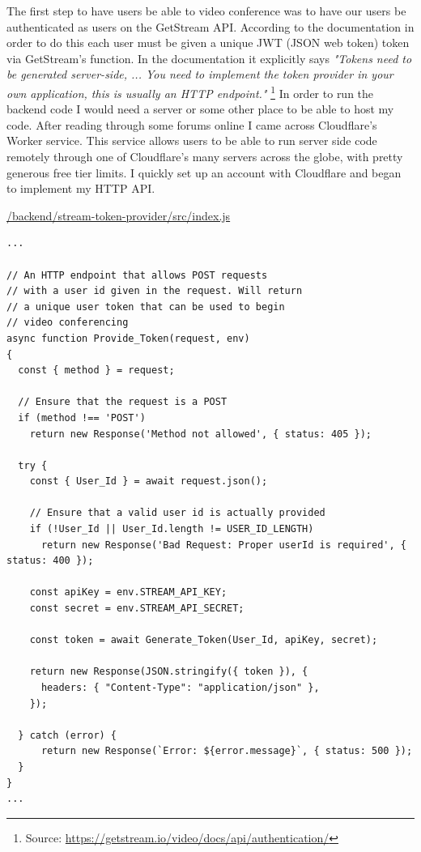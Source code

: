 The first step to have users be able to 
video conference was to have our users be authenticated as 
users on the GetStream API. According to the documentation
in order to do this each user must be given a unique JWT 
(JSON web token) token via GetStream's
 function. In the documentation
it explicitly says \textit{"Tokens need to be generated server-side,
... You need to implement the token provider in your own application, 
this is usually an HTTP endpoint."} \footnote{Source: 
\url{https://getstream.io/video/docs/api/authentication/}} 
In order to run the backend code I would need a server or some 
other place to be able to host my code. After reading through 
some forums online I came across Cloudflare's Worker service.
This service allows users to be able to run server side code 
remotely through one of Cloudflare's many servers across the globe,
with pretty generous free tier limits. I quickly set up an account
with Cloudflare and began to implement my HTTP API. \\ \vspace{0.2cm}

\underline{/backend/stream-token-provider/src/index.js} \\

\begin{verbatim}
...

// An HTTP endpoint that allows POST requests
// with a user id given in the request. Will return
// a unique user token that can be used to begin
// video conferencing
async function Provide_Token(request, env)
{
  const { method } = request;

  // Ensure that the request is a POST
  if (method !== 'POST')
    return new Response('Method not allowed', { status: 405 });

  try {
    const { User_Id } = await request.json();

    // Ensure that a valid user id is actually provided
    if (!User_Id || User_Id.length != USER_ID_LENGTH)
      return new Response('Bad Request: Proper userId is required', { status: 400 });

    const apiKey = env.STREAM_API_KEY;
    const secret = env.STREAM_API_SECRET;

    const token = await Generate_Token(User_Id, apiKey, secret);

    return new Response(JSON.stringify({ token }), {
      headers: { "Content-Type": "application/json" },
    });

  } catch (error) {
      return new Response(`Error: ${error.message}`, { status: 500 });
  }
}
...
\end{verbatim}

